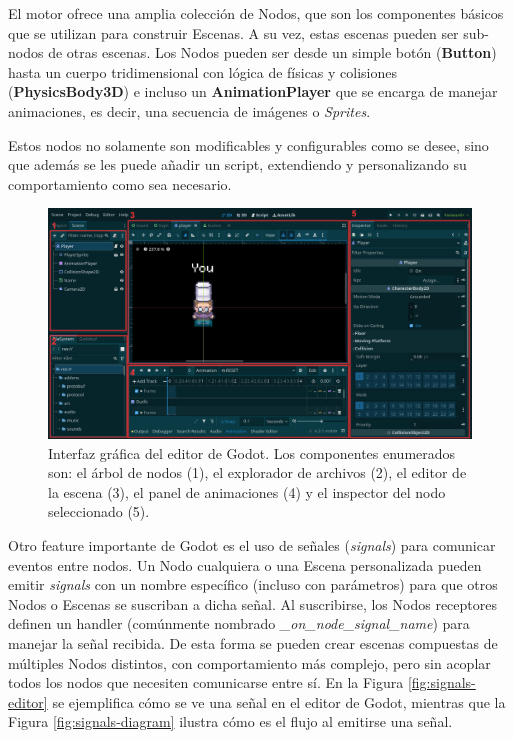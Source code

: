 El motor ofrece una amplia colección de Nodos, que son los componentes básicos que se utilizan para 
construir Escenas. A su vez, estas escenas pueden ser sub-nodos de otras escenas. Los Nodos pueden ser desde un 
simple botón (\textbf{Button}) hasta un cuerpo tridimensional con lógica de físicas y colisiones 
(\textbf{PhysicsBody3D}) e incluso un \textbf{AnimationPlayer} que se encarga de manejar animaciones, 
es decir, una secuencia de imágenes o \textit{Sprites}.

Estos nodos no solamente son modificables y configurables como se desee, sino que además se les puede 
añadir un script, extendiendo y personalizando su comportamiento como sea necesario.

\begin{figure}[htbp]
    \centering
    \includegraphics[width=1.0\textwidth]{../assets/godot-editor.png}
    \caption{Interfaz gráfica del editor de Godot. Los componentes enumerados son: el árbol de nodos (1),
            el explorador de archivos (2), el editor de la escena (3), el panel de animaciones (4) y el
            inspector del nodo seleccionado (5).}
\end{figure}

Otro feature importante de Godot es el uso de señales (\textit{signals}) para comunicar eventos entre nodos.
Un Nodo cualquiera o una Escena personalizada pueden emitir \textit{signals} con un nombre específico 
(incluso con parámetros) para que otros Nodos o Escenas se suscriban a dicha señal. Al suscribirse, los 
Nodos receptores definen un handler (comúnmente nombrado \textit{\_on\_node\_signal\_name}) para manejar 
la señal recibida. De esta forma se pueden crear escenas compuestas de múltiples Nodos distintos, con 
comportamiento más complejo, pero sin acoplar todos los nodos que necesiten comunicarse entre sí. En la
Figura \ref{fig:signals-editor} se ejemplifica cómo se ve una señal en el editor de Godot, mientras que
la Figura \ref{fig:signals-diagram} ilustra cómo es el flujo al emitirse una señal.


